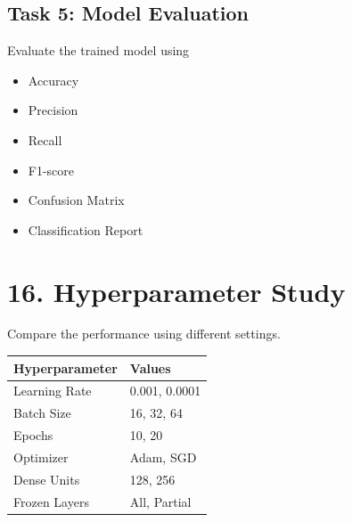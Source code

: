 \documentclass[11pt]{article}
\begin{document}

\subsection*{Task 5: Model Evaluation}

Evaluate the trained model using

\begin{itemize}

\item Accuracy

\item Precision

\item Recall

\item F1-score

\item Confusion Matrix

\item Classification Report

\end{itemize}


\section*{16. Hyperparameter Study}

Compare the performance using different settings.

\begin{center}

\begin{tabular}{|l|l|}

\hline

Hyperparameter & Values\\

\hline

Learning Rate &
0.001, 0.0001\\

\hline

Batch Size &
16, 32, 64\\

\hline

Epochs &
10, 20\\

\hline

Optimizer &
Adam, SGD\\

\hline

Dense Units &
128, 256\\

\hline

Frozen Layers &
All, Partial\\

\hline

\end{tabular}

\end{center}
\end{document}
